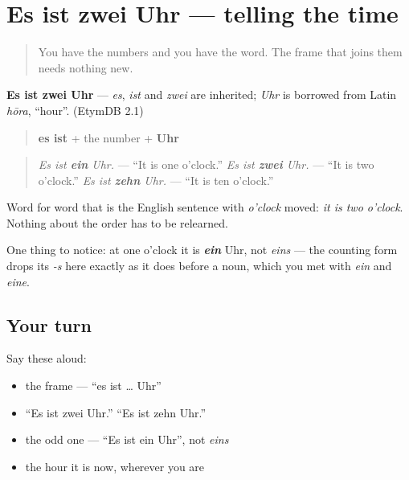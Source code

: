 \section[Es ist zwei Uhr]{Es ist zwei Uhr — telling the time}

\label{lesson:GE-C08-es-ist-uhr}



\begin{quote}
You have the numbers and you have the word. The frame that joins them needs nothing new.
\end{quote}

\begin{cousinweb}
\textbf{Es ist zwei Uhr} — \emph{es}, \emph{ist} and \emph{zwei} are inherited; \emph{Uhr} is borrowed from Latin \emph{hōra}, \textquotedblleft{}hour\textquotedblright{}. (EtymDB 2.1)
\end{cousinweb}

\begin{grammarlens}[title={Grammar Lens: es ist, a number, Uhr}]
\begin{quote}
\textbf{es ist} + the number + \textbf{Uhr}
\end{quote}

\begin{quote}
\emph{Es ist \textbf{ein} Uhr.} — \textquotedblleft{}It is one o'clock.\textquotedblright{} \emph{Es ist \textbf{zwei} Uhr.} — \textquotedblleft{}It is two o'clock.\textquotedblright{} \emph{Es ist \textbf{zehn} Uhr.} — \textquotedblleft{}It is ten o'clock.\textquotedblright{}
\end{quote}

Word for word that is the English sentence with \emph{o'clock} moved: \emph{it is two o'clock}. Nothing about the order has to be relearned.

One thing to notice: at one o'clock it is \emph{\textbf{ein}} Uhr, not \emph{eins} — the counting form drops its \emph{-s} here exactly as it does before a noun, which you met with \emph{ein} and \emph{eine}.
\end{grammarlens}

\subsection*{Your turn}
Say these aloud:

\begin{itemize}
\raggedright
  \item the frame — \textquotedblleft{}es ist … Uhr\textquotedblright{}
  \item \textquotedblleft{}Es ist zwei Uhr.\textquotedblright{} \textquotedblleft{}Es ist zehn Uhr.\textquotedblright{}
  \item the odd one — \textquotedblleft{}Es ist ein Uhr\textquotedblright{}, not \emph{eins}
  \item the hour it is now, wherever you are
\end{itemize}

